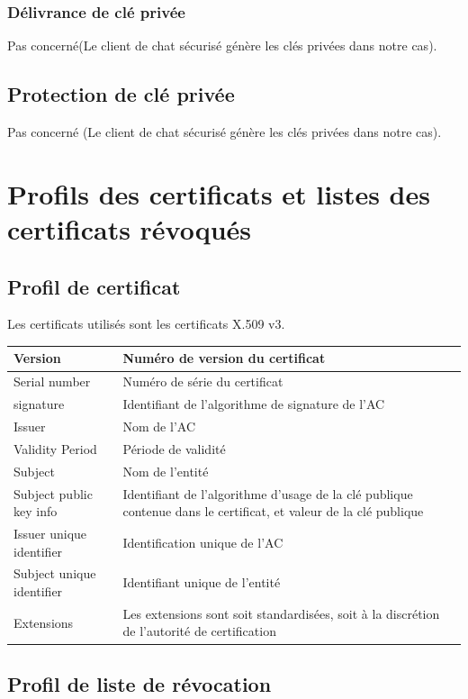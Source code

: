 \documentclass[a4paper,11pt,french]{article}
\begin{document}
\subsubsection{Délivrance de clé privée}
Pas concerné(Le client de chat sécurisé génère les clés privées dans notre cas).

\subsection{Protection de clé privée}
Pas concerné (Le client de chat sécurisé génère les clés privées dans notre cas).

\section{Profils des certificats et listes des certificats révoqués}
\subsection{Profil de certificat}
Les certificats utilisés sont les certificats X.509 v3.\\

\begin{tabular}{|l|p{10cm}|}
\hline
Version  & Numéro de version du certificat 
\\
\hline
Serial number  & Numéro de série du certificat
\\
\hline
signature  & Identifiant de l'algorithme de signature de l'AC 
\\
\hline
Issuer  & Nom de l'AC
\\
\hline
Validity Period  & Période de validité
\\
\hline
Subject  & Nom de l'entité
\\
\hline
Subject public key info &  Identifiant de l'algorithme d'usage de la clé publique contenue dans le certificat, et valeur de la clé publique
\\
\hline
 Issuer unique identifier  & Identification unique de l'AC
\\
\hline
Subject unique identifier  & Identifiant unique de l'entité
\\
\hline
Extensions  & Les extensions sont soit standardisées, soit à la discrétion de l’autorité de certification
\\
\hline
\end{tabular}


\subsection{Profil de liste de révocation}
\end{document}
